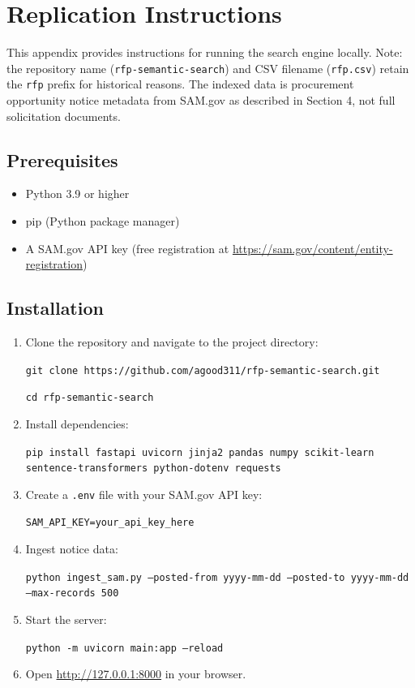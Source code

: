 \documentclass[10pt,twocolumn]{article}
\begin{document}
\printbibliography

\appendix

\clearpage
\onecolumn

\section{Replication Instructions}

This appendix provides instructions for running the search engine locally. Note: the repository name (\texttt{rfp-semantic-search}) and CSV filename (\texttt{rfp.csv}) retain the \texttt{rfp} prefix for historical reasons. The indexed data is procurement opportunity notice metadata from SAM.gov as described in Section 4, not full solicitation documents.

\subsection{Prerequisites}

\begin{itemize}
    \item Python 3.9 or higher
    \item pip (Python package manager)
    \item A SAM.gov API key (free registration at \url{https://sam.gov/content/entity-registration})
\end{itemize}

\subsection{Installation}

\begin{enumerate}
    \item Clone the repository and navigate to the project directory:

    \texttt{git clone https://github.com/agood311/rfp-semantic-search.git}

    \texttt{cd rfp-semantic-search}

    \item Install dependencies:

    \texttt{pip install fastapi uvicorn jinja2 pandas numpy scikit-learn sentence-transformers python-dotenv requests}

    \item Create a \texttt{.env} file with your SAM.gov API key:

    \texttt{SAM\_API\_KEY=your\_api\_key\_here}

    \item Ingest notice data:

    \texttt{python ingest\_sam.py --posted-from yyyy-mm-dd --posted-to yyyy-mm-dd --max-records 500}

    \item Start the server:

    \texttt{python -m uvicorn main:app --reload}

    \item Open \url{http://127.0.0.1:8000} in your browser.
\end{enumerate}
\end{document}
